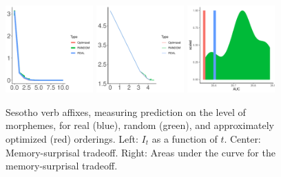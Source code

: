 \documentclass[11pt,letterpaper]{article}
\begin{document}
\begin{figure}
	\begin{center}
\includegraphics[width=0.3\textwidth]{../code/ngram-control/create_models_ngrams/morph/Sesotho/tradeoffs/figures/Sesotho-suffixes-byMorphemes-it.pdf}
\includegraphics[width=0.3\textwidth]{../code/ngram-control/create_models_ngrams/morph/Sesotho/tradeoffs/figures/Sesotho-suffixes-byMorphemes-memsurp.pdf}
\includegraphics[width=0.3\textwidth]{../code/ngram-control/create_models_ngrams/morph/Sesotho/tradeoffs/figures/Sesotho-suffixes-byMorphemes-auc-hist.pdf}
\end{center}
	\caption{Sesotho verb affixes, measuring prediction on the level of morphemes, for real (blue), random (green), and approximately optimized (red) orderings. Left: $I_t$ as a function of $t$. Center: Memory-surprisal tradeoff. Right: Areas under the curve for the memory-surprisal tradeoff.}\label{fig:jap-morph}
\end{figure}


\end{document}

